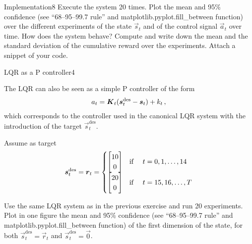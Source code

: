 \begin{questions}
\begin{question}{Implementation}{8}
	Execute the system 20 times.
	Plot the mean and 95\% confidence (see ``68--95--99.7 rule'' and matplotlib.pyplot.fill\_between function) over the different experiments of the state $\vec s_t$ and of the control signal $\vec a_t$ over time. 
	How does the system behave? 
	Compute and write down the mean and the standard deviation of the cumulative reward over the experiments. 
	Attach a snippet of your code.
	
\begin{answer}\end{answer}


\end{question}


\begin{question}{LQR as a P controller}{4}

	The LQR can also be seen as a simple P controller of the form
	\begin{align}
		a_t = \mat K_t (\vec s^\text{des}_t - \vec s_t) + k_t\,,
	\end{align}
	which corresponds to the controller used in the canonical LQR system with the introduction of the target $\vec s^\text{des}_t$.
	
	Assume as target 
	\begin{align}
        \vec s^\text{des}_t = \vec r_t = \begin{cases}
        \begin{bmatrix}
        10\\
        0
        \end{bmatrix}  & \text{if \quad} t=0,1,\ldots,14
        \\
        \begin{bmatrix}
        20\\
        0
        \end{bmatrix}  & \text{if \quad} t=15,16,\ldots,T
        \end{cases}	
	\end{align}
    
    Use the same LQR system as in the previous exercise and run 20 experiments. Plot in one figure the mean and 95\% confidence (see ``68--95--99.7 rule'' and matplotlib.pyplot.fill\_between function) of the first dimension of the state, for both $\vec s^\text{des}_t = \vec r_t$ and $\vec s^\text{des}_t = \vec 0$.

\begin{answer}\end{answer}
\end{question}


\end{questions}
